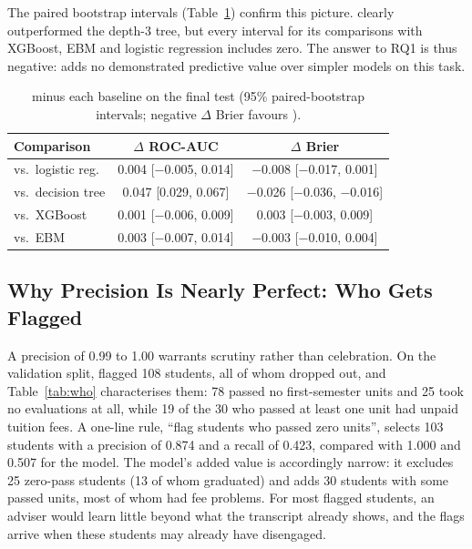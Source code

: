 The paired bootstrap intervals (Table~\ref{tab:paired}) confirm this picture. \tabicl clearly
outperformed the depth-3 tree, but every interval for its comparisons with XGBoost, EBM and logistic
regression includes zero. The answer to RQ1 is thus negative: \tabicl adds no demonstrated
predictive value over simpler models on this task.

\begin{table}[!htb]
\centering
\caption{\tabicl minus each baseline on the final test (95\% paired-bootstrap intervals; negative $\Delta$ Brier favours \tabicl).}
\label{tab:paired}
\footnotesize
\setlength{\tabcolsep}{3pt}
\begin{tabular}{@{}lcc@{}}
\toprule
\textbf{Comparison} & \textbf{$\Delta$ ROC-AUC} & \textbf{$\Delta$ Brier} \\
\midrule
vs.\ logistic reg. & 0.004 [$-$0.005, 0.014] & $-$0.008 [$-$0.017, 0.001] \\
vs.\ decision tree & 0.047 [0.029, 0.067] & $-$0.026 [$-$0.036, $-$0.016] \\
vs.\ XGBoost       & 0.001 [$-$0.006, 0.009] & 0.003 [$-$0.003, 0.009] \\
vs.\ EBM           & 0.003 [$-$0.007, 0.014] & $-$0.003 [$-$0.010, 0.004] \\
\bottomrule
\end{tabular}
\end{table}

\subsection{Why Precision Is Nearly Perfect: Who Gets Flagged}
\label{sec:who}

A precision of 0.99 to 1.00 warrants scrutiny rather than celebration. On the validation split,
\tabicl flagged 108 students, all of whom dropped out, and Table~\ref{tab:who} characterises them:
78 passed no first-semester units and 25 took no evaluations at all, while 19 of the 30 who passed
at least one unit had unpaid tuition fees. A one-line rule, ``flag students who passed zero
units'', selects 103 students with a precision of 0.874 and a recall of 0.423, compared with 1.000
and 0.507 for the model. The model's added value is accordingly narrow: it excludes 25 zero-pass
students (13 of whom graduated) and adds 30 students with some passed units, most of whom had fee
problems. For most flagged students, an adviser would learn little beyond what the transcript
already shows, and the flags arrive when these students may already have disengaged.


